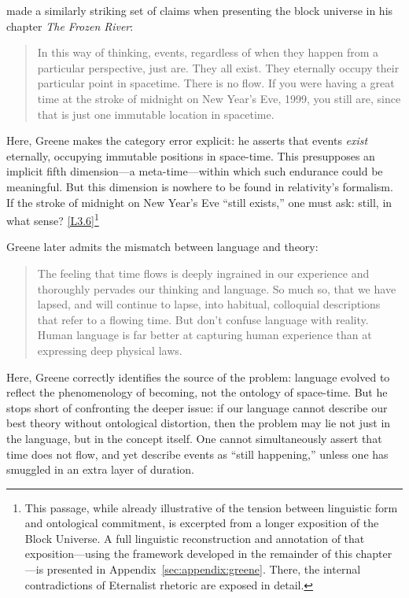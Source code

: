 \documentclass[12pt]{book}
\newcounter{logicanchor}
\newenvironment{logicanchorenv}[1]{\refstepcounter{logicanchor}\label{#1}}{}
\newcommand{\logiclink}[2]{\begin{logicanchorenv}{logic:#1}\end{logicanchorenv}\hyperref[appendix:#1]{[#1]}\xspace}
\begin{document}
\citet{Greene2004} made a similarly striking set of claims when presenting the block universe in his chapter \textit{The Frozen River}:
\begin{quote}
In this way of thinking, events, regardless of when they happen from a particular perspective, just are. They all exist. They eternally occupy their particular point in spacetime. There is no flow. If you were having a great time at the stroke of midnight on New Year's Eve, 1999, you still are, since that is just one immutable location in spacetime.
\end{quote}
Here, Greene makes the category error explicit: he asserts that events \textit{exist} eternally, occupying immutable positions in space-time. This presupposes an implicit fifth dimension---a meta-time---within which such endurance could be meaningful. But this dimension is nowhere to be found in relativity's formalism. If the stroke of midnight on New Year's Eve ``still exists,'' one must ask: still, in what sense? \logiclink{L3.6}{}\footnote{This passage, while already illustrative of the tension between linguistic form and ontological commitment, is excerpted from a longer exposition of the Block Universe. A full linguistic reconstruction and annotation of that exposition---using the framework developed in the remainder of this chapter---is presented in Appendix~\ref{sec:appendix:greene}. There, the internal contradictions of Eternalist rhetoric are exposed in detail.}

Greene later admits the mismatch between language and theory:
\begin{quote}
The feeling that time flows is deeply ingrained in our experience and thoroughly pervades our thinking and language. So much so, that we have lapsed, and will continue to lapse, into habitual, colloquial descriptions that refer to a flowing time. But don't confuse language with reality. Human language is far better at capturing human experience than at expressing deep physical laws.
\end{quote}

Here, Greene correctly identifies the source of the problem: language evolved to reflect the phenomenology of becoming, not the ontology of space-time. But he stops short of confronting the deeper issue: if our language cannot describe our best theory without ontological distortion, then the problem may lie not just in the language, but in the concept itself. One cannot simultaneously assert that time does not flow, and yet describe events as ``still happening,'' unless one has smuggled in an extra layer of duration.
\end{document}
